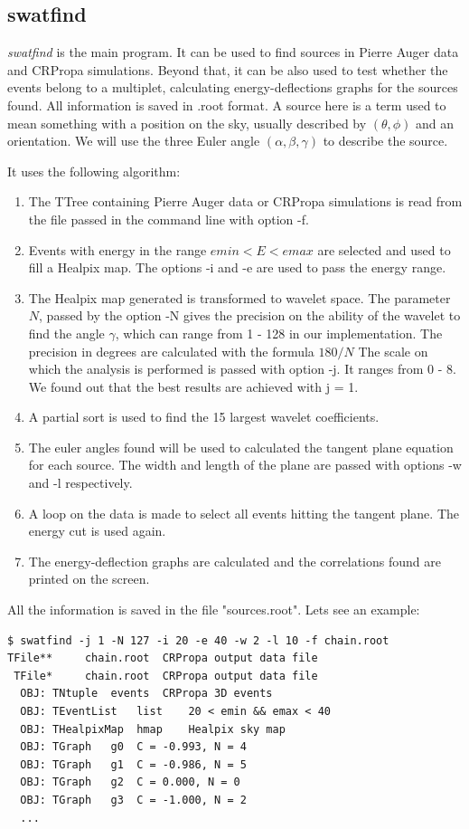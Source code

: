 \documentclass[12pt]{article}
\begin{document}
\subsection{swatfind}
{\it swatfind} is the main program. It can be used to find sources in Pierre
Auger data and CRPropa simulations. Beyond that, it can be also used to test
whether the events belong to a multiplet, calculating energy-deflections graphs
for the sources found. All information is saved in .root format. A source here
is a term used to mean something with a position on the sky, usually described
by $(\theta,\phi)$ and an orientation. We will use the three Euler angle
$(\alpha,\beta,\gamma)$ to describe the source. 

It uses the following algorithm:
\begin{enumerate}
\item The TTree containing Pierre Auger data or CRPropa simulations
is read from the file passed in the command line with option -f.
\item Events with energy in the range $emin < E < emax$ are selected and used
to fill a Healpix map.  The options -i and -e are used to pass the energy range.
\item The Healpix map generated is transformed to wavelet space. The parameter
$N$, passed by the option -N gives the precision on the ability of the wavelet
to find the angle $\gamma$, which can range from 1 - 128 in our implementation. 
The precision in degrees are calculated with the formula $180/N$ The scale on
which the analysis is performed is passed with option -j. It ranges from 0 - 8.
We found out that the best results are achieved with j = 1.
\item A partial sort is used to find the 15 largest wavelet coefficients.
\item The euler angles found will be used to calculated the tangent plane
equation for each source. The width and length of the plane are passed with
options -w and -l respectively.
\item A loop on the data is made to select all events hitting the tangent
plane. The energy cut is used again.
\item The energy-deflection graphs are calculated and the correlations found
are printed on the screen.
\end{enumerate}
All the information is saved in the file {\color{brown}"sources.root"}.  Lets see an example:

{\bf \color{brown}
\begin{lstlisting}
$ swatfind -j 1 -N 127 -i 20 -e 40 -w 2 -l 10 -f chain.root
TFile**		chain.root	CRPropa output data file
 TFile*		chain.root	CRPropa output data file
  OBJ: TNtuple	events	CRPropa 3D events
  OBJ: TEventList	list	20 < emin && emax < 40 
  OBJ: THealpixMap	hmap	Healpix sky map
  OBJ: TGraph	g0	C = -0.993, N = 4 
  OBJ: TGraph	g1	C = -0.986, N = 5
  OBJ: TGraph	g2	C = 0.000, N = 0
  OBJ: TGraph	g3	C = -1.000, N = 2
  ...
\end{lstlisting}
}
\end{document}
